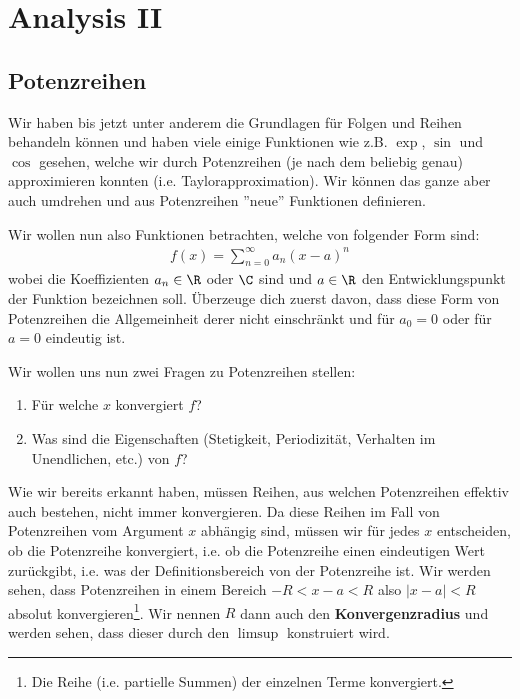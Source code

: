 \chapter{Analysis II}

\section{Potenzreihen}
Wir haben bis jetzt unter anderem die Grundlagen für Folgen und Reihen behandeln können und haben viele einige Funktionen wie z.B. $\exp$, $\sin$ und $\cos$ gesehen, welche wir durch Potenzreihen (je nach dem beliebig genau) approximieren konnten (i.e. Taylorapproximation). Wir können das ganze aber auch umdrehen und aus Potenzreihen ''neue'' Funktionen definieren.

Wir wollen nun also Funktionen betrachten, welche von folgender Form sind:
\begin{align}\label{eq_fcn_potenzreihe}
    f(x) = \sum^\infty_{n=0} a_n (x-a)^n
\end{align}
wobei die Koeffizienten $a_n \in \R$ oder $\C$ sind und $a \in \R$ den Entwicklungspunkt der Funktion bezeichnen soll. Überzeuge dich zuerst davon, dass diese Form von Potenzreihen die Allgemeinheit derer nicht einschränkt und für $a_0 = 0$ oder für $a = 0$ eindeutig ist.

Wir wollen uns nun zwei Fragen zu Potenzreihen stellen:
\begin{enumerate}
    \item Für welche $x$ konvergiert $f$?
    \item Was sind die Eigenschaften (Stetigkeit, Periodizität, Verhalten im Unendlichen, etc.) von $f$?
\end{enumerate}
Wie wir bereits erkannt haben, müssen Reihen, aus welchen Potenzreihen effektiv auch bestehen, nicht immer konvergieren. Da diese Reihen im Fall von Potenzreihen vom Argument $x$ abhängig sind, müssen wir für jedes $x$ entscheiden, ob die Potenzreihe konvergiert, i.e. ob die Potenzreihe einen eindeutigen Wert zurückgibt, i.e. was der Definitionsbereich von der Potenzreihe ist. Wir werden sehen, dass Potenzreihen in einem Bereich $-R < x-a < R$ also $|x-a| < R$ absolut konvergieren\footnote{Die Reihe (i.e. partielle Summen) der einzelnen Terme konvergiert.}. Wir nennen $R$ dann auch den \textbf{Konvergenzradius} und werden sehen, dass dieser durch den $\limsup$ konstruiert wird.

